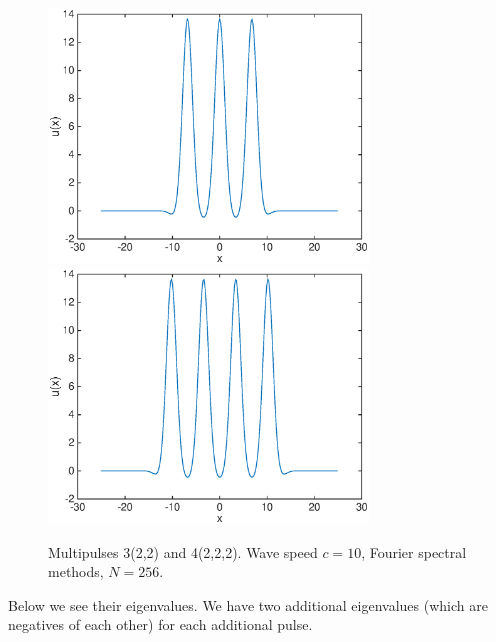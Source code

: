 \documentclass[12pt]{article}
\begin{document}
\begin{figure}[H]
	\includegraphics[width=8.5cm]{four10um1_3}
	\includegraphics[width=8.5cm]{four10um1_4.eps}
	\caption{Multipulses 3(2,2) and 4(2,2,2). Wave speed $c = 10$, Fourier spectral methods, $N = 256$.}
\end{figure}

Below we see their eigenvalues. We have two additional eigenvalues (which are negatives of each other) for each additional pulse.
\end{document}
